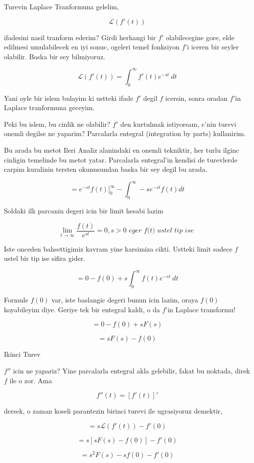 \documentclass[12pt,fleqn]{article}\usepackage{../common}
\begin{document}
Turevin Laplace Tranformuna gelelim,

\[ \mathcal{L}(f'(t)) \]

ifadesini nasil tranform ederim? Girdi herhangi bir $f'$ olabilecegine
gore, elde edilmesi umulabilecek en iyi sonuc, ogeleri temel fonksiyon
$f$'i iceren bir seyler olabilir. Baska bir sey bilmiyoruz. 

\[ \mathcal{L}(f'(t)) = \int_0^{\infty} f'(t)e^{-st} \ dt \]

Yani oyle bir islem bulayim ki ustteki ifade $f'$ degil $f$ icersin, sonra
oradan $f$'in Laplace tranformuna geceyim. 

Peki bu islem, bu cinlik ne olabilir? $f'$ den kurtulmak istiyorsam,
$e$'nin turevi onemli degilse ne yaparim? Parcalarla entegral (integration
by parts) kullanirim. 

Bu arada bu metot Ileri Analiz alanindaki en onemli tekniktir, her turlu
ilginc cinligin temelinde bu metot yatar. Parcalarla entegral'in kendisi de
turevlerde carpim kuralinin tersten okunusundan baska bir sey degil bu arada.

\[ = e^{-st}f(t) \bigg]_{0}^{\infty}  - 
\int_{0}^{\infty} -s e^{-st}f(t)dt
 \]

Soldaki ilk parcanin degeri icin bir limit hesabi lazim

\[ \lim_{t \to \infty} \frac{f(t)}{e^{st}} = 0 
, s>0
\textit{ eger f(t) ustel tip ise }
\]

Iste onceden bahsettigimiz kavram yine karsimiza cikti. Ustteki limit
sadece $f$ ustel bir tip ise sifira gider. 

\[=  0 - f(0) + s \int_0^{\infty} f(t)e^{-st} \ dt
 \]

Formule $f(0)$ var, iste baslangic degeri bunun icin lazim, oraya $f(0)$
koyabileyim diye. Geriye tek bir entegral kaldi, o da $f$'in Laplace
transformu! 

\[=  0 - f(0) + s F(s) \]

\[=  s F(s) - f(0) \]

Ikinci Turev

$f''$ icin ne yapariz? Yine parcalarla entegral akla gelebilir, fakat bu
noktada, direk $f$ ile o zor. Ama 

\[ f''(t) = [f'(t)]' \]

dersek, o zaman koseli parantezin birinci turevi ile ugrasiyoruz demektir,

\[ = s \mathcal{L} (f'(t)) - f'(0)\]

\[ =  s[sF(s) -f(0)] - f'(0)\]

\[ =  s^2F(s) - sf(0) - f'(0)\]
\end{document}
